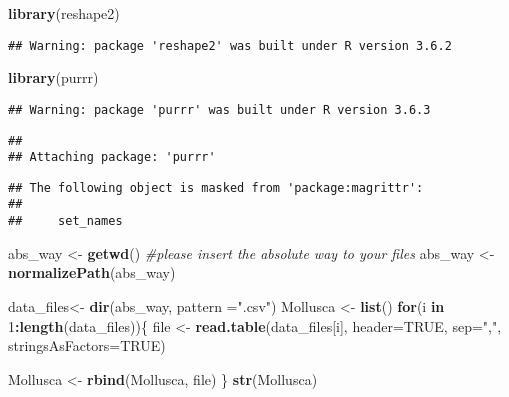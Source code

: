 \documentclass[
]{article}
\newenvironment{Shaded}{\begin{snugshade}}{\end{snugshade}}
\newcommand{\CommentTok}[1]{\textcolor[rgb]{0.56,0.35,0.01}{\textit{#1}}}
\newcommand{\ControlFlowTok}[1]{\textcolor[rgb]{0.13,0.29,0.53}{\textbf{#1}}}
\newcommand{\DataTypeTok}[1]{\textcolor[rgb]{0.13,0.29,0.53}{#1}}
\newcommand{\DecValTok}[1]{\textcolor[rgb]{0.00,0.00,0.81}{#1}}
\newcommand{\KeywordTok}[1]{\textcolor[rgb]{0.13,0.29,0.53}{\textbf{#1}}}
\newcommand{\NormalTok}[1]{#1}
\newcommand{\OperatorTok}[1]{\textcolor[rgb]{0.81,0.36,0.00}{\textbf{#1}}}
\newcommand{\OtherTok}[1]{\textcolor[rgb]{0.56,0.35,0.01}{#1}}
\newcommand{\StringTok}[1]{\textcolor[rgb]{0.31,0.60,0.02}{#1}}
\begin{document}
\begin{Shaded}
\begin{Highlighting}[]
\KeywordTok{library}\NormalTok{(reshape2)}
\end{Highlighting}
\end{Shaded}

\begin{verbatim}
## Warning: package 'reshape2' was built under R version 3.6.2
\end{verbatim}

\begin{Shaded}
\begin{Highlighting}[]
\KeywordTok{library}\NormalTok{(purrr)}
\end{Highlighting}
\end{Shaded}

\begin{verbatim}
## Warning: package 'purrr' was built under R version 3.6.3
\end{verbatim}

\begin{verbatim}
## 
## Attaching package: 'purrr'
\end{verbatim}

\begin{verbatim}
## The following object is masked from 'package:magrittr':
## 
##     set_names
\end{verbatim}

\begin{Shaded}
\begin{Highlighting}[]
\NormalTok{abs_way <-}\StringTok{ }\KeywordTok{getwd}\NormalTok{()}
\CommentTok{#please insert the absolute way to your files}
\NormalTok{abs_way <-}\StringTok{ }\KeywordTok{normalizePath}\NormalTok{(abs_way)}

\NormalTok{data_files<-}\StringTok{ }\KeywordTok{dir}\NormalTok{(abs_way, }\DataTypeTok{pattern =}\StringTok{".csv"}\NormalTok{)}
\NormalTok{Mollusca <-}\StringTok{ }\KeywordTok{list}\NormalTok{()}
\ControlFlowTok{for}\NormalTok{(i }\ControlFlowTok{in} \DecValTok{1}\OperatorTok{:}\KeywordTok{length}\NormalTok{(data_files))\{}
\NormalTok{file <-}\StringTok{ }\KeywordTok{read.table}\NormalTok{(data_files[i], }\DataTypeTok{header=}\OtherTok{TRUE}\NormalTok{, }\DataTypeTok{sep=}\StringTok{","}\NormalTok{, }\DataTypeTok{stringsAsFactors=}\OtherTok{TRUE}\NormalTok{)}


\NormalTok{Mollusca <-}\StringTok{ }\KeywordTok{rbind}\NormalTok{(Mollusca, file)}
\NormalTok{\}}
\KeywordTok{str}\NormalTok{(Mollusca)}
\end{Highlighting}
\end{Shaded}
\end{document}
